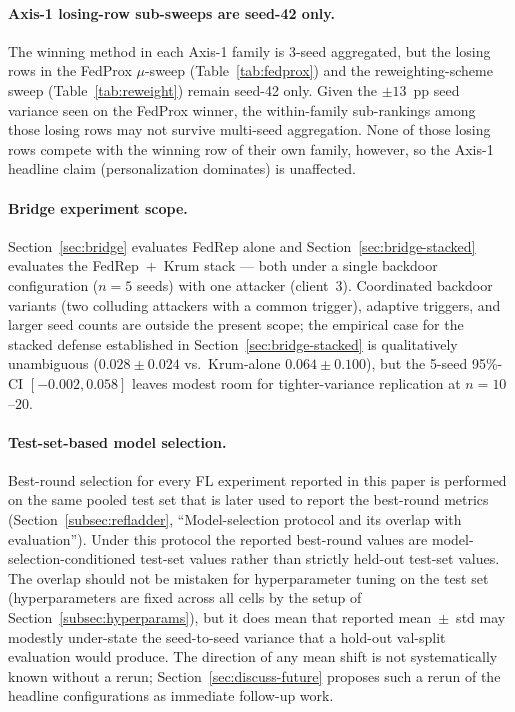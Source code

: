 \documentclass[a4paper,fleqn,doubleblind]{cas-sc}
\begin{document}
\paragraph{Axis-1 losing-row sub-sweeps are seed-42 only.}
The winning method in each Axis-1 family is 3-seed aggregated, but
the losing rows in the FedProx $\mu$-sweep
(Table~\ref{tab:fedprox}) and the reweighting-scheme sweep
(Table~\ref{tab:reweight}) remain seed-42 only. Given the
$\pm 13$~pp seed variance seen on the FedProx winner, the
within-family sub-rankings among those losing rows may not survive
multi-seed aggregation. None of those losing rows compete with the
winning row of their own family, however, so the Axis-1 headline
claim (personalization dominates) is unaffected.

\paragraph{Bridge experiment scope.}
Section~\ref{sec:bridge} evaluates FedRep alone and
Section~\ref{sec:bridge-stacked} evaluates the FedRep~$+$~Krum stack
--- both under a single backdoor configuration ($n = 5$ seeds) with
one attacker (client~3). Coordinated backdoor variants (two
colluding attackers with a common trigger), adaptive triggers, and
larger seed counts are outside the present scope; the empirical
case for the stacked defense established in
Section~\ref{sec:bridge-stacked} is qualitatively unambiguous
($0.028 \pm 0.024$ vs.\ Krum-alone $0.064 \pm 0.100$), but the
5-seed 95\%-CI $[-0.002, 0.058]$ leaves modest room for
tighter-variance replication at $n = 10$--$20$.

\paragraph{Test-set-based model selection.}
Best-round selection for every FL experiment reported in this paper
is performed on the same pooled test set that is later used to
report the best-round metrics
(Section~\ref{subsec:refladder}, ``Model-selection protocol and
its overlap with evaluation''). Under this protocol the reported
best-round values are model-selection-conditioned test-set values
rather than strictly held-out test-set values. The overlap should
not be mistaken for hyperparameter tuning on the test set
(hyperparameters are fixed across all cells by the setup of
Section~\ref{subsec:hyperparams}), but it does mean that reported
mean~$\pm$~std may modestly under-state the seed-to-seed variance
that a hold-out val-split evaluation would produce. The direction
of any mean shift is not systematically known without a rerun;
Section~\ref{sec:discuss-future} proposes such a rerun of the
headline configurations as immediate follow-up work.
\end{document}
